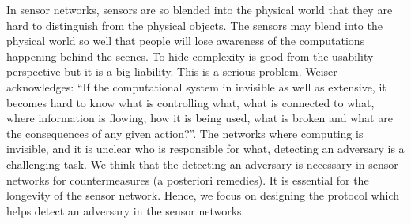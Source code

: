 	In sensor networks, sensors are so blended into the physical world that they are hard to distinguish from the physical objects.
	The sensors may blend into the physical world so well that people will lose awareness of the computations happening behind the scenes.
	To hide complexity is good from the usability perspective but it is a big liability.
	This is a serious problem.
	Weiser \cite{weiser1999origins} acknowledges: 
	``If the computational system in invisible as well as extensive, it becomes hard to know what is controlling what, what is connected to what, where information is flowing, how it is being used, what is broken and what are the consequences of any given action?''.
	The networks where computing is invisible, and it is unclear who is responsible for what, detecting an adversary is a challenging task.
	We think that the detecting an adversary is necessary in sensor networks for countermeasures (a posteriori remedies).
	It is essential for the longevity of the sensor network.
	Hence, we focus on designing the protocol which helps detect an adversary in the sensor networks.

